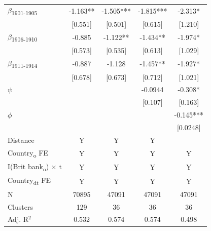 {\begin{tabular}{l*{4}{c}}
$\beta$\textsubscript{1901-1905}&      -1.163** &      -1.505***&      -1.815***&      -2.313*  \\
            &     [0.551]   &     [0.501]   &     [0.615]   &     [1.210]   \\
$\beta$\textsubscript{1906-1910}&      -0.885   &      -1.122** &      -1.434** &      -1.974*  \\
            &     [0.573]   &     [0.535]   &     [0.613]   &     [1.029]   \\
$\beta$\textsubscript{1911-1914}&      -0.887   &      -1.128   &      -1.457** &      -1.927*  \\
            &     [0.678]   &     [0.673]   &     [0.712]   &     [1.021]   \\
$\psi$      &               &               &     -0.0944   &      -0.308*  \\
            &               &               &     [0.107]   &     [0.163]   \\
$\phi$      &               &               &               &      -0.145***\\
            &               &               &               &    [0.0248]   \\
Distance    &           Y   &           Y   &           Y   &               \\
Country\textsubscript{o} FE&           Y   &           Y   &           Y   &           Y   \\
I(Brit bank\textsubscript{o}) $\times$ t&           Y   &           Y   &           Y   &           Y   \\
Country\textsubscript{dt} FE&           Y   &           Y   &           Y   &           Y   \\
\midrule
N           &       70895   &       47091   &       47091   &       47091   \\
Clusters    &         129   &          36   &          36   &          36   \\
Adj. R{$^2$}&       0.532   &       0.574   &       0.574   &       0.498   \\
\bottomrule
\end{tabular}
}
